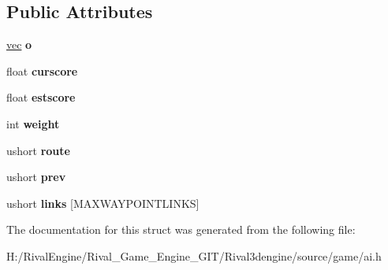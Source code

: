 \subsection*{Public Attributes}
\begin{DoxyCompactItemize}
\item 
\mbox{\label{structai_1_1waypoint_a09e6a5c64f39815499071bd8944f1617}} 
\hyperlink{structvec}{vec} {\bfseries o}
\item 
\mbox{\label{structai_1_1waypoint_a8402df07656fb95128754616fc22cbac}} 
float {\bfseries curscore}
\item 
\mbox{\label{structai_1_1waypoint_a246e51cf608dd0fd8b9cbe5059e0b21d}} 
float {\bfseries estscore}
\item 
\mbox{\label{structai_1_1waypoint_a1b631112c8675e798b193398f7739f2b}} 
int {\bfseries weight}
\item 
\mbox{\label{structai_1_1waypoint_a96df64d25285ba178adcea0f554cc846}} 
ushort {\bfseries route}
\item 
\mbox{\label{structai_1_1waypoint_aaeec1e6f4946b32d69c48da1cd51d3b4}} 
ushort {\bfseries prev}
\item 
\mbox{\label{structai_1_1waypoint_ac6cf5ea64599231b8da7c2579ec79791}} 
ushort {\bfseries links} \mbox{[}M\+A\+X\+W\+A\+Y\+P\+O\+I\+N\+T\+L\+I\+N\+KS\mbox{]}
\end{DoxyCompactItemize}


The documentation for this struct was generated from the following file\+:\begin{DoxyCompactItemize}
\item 
H\+:/\+Rival\+Engine/\+Rival\+\_\+\+Game\+\_\+\+Engine\+\_\+\+G\+I\+T/\+Rival3dengine/source/game/ai.\+h\end{DoxyCompactItemize}
